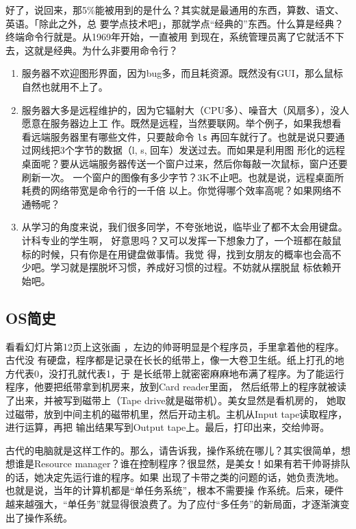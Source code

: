 \documentclass{wx672ctexart}
\newcommand\mpic[1]{%
  \marginpar{\texttt{[image: thumbnails/\#1]}}}
\begin{document}
好了，说回来，那5\%能被用到的是什么？其实就是最通用的东西，算数、语文、英语。「除此之外，总
要学点技术吧」，那就学点“经典的”东西。什么算是经典？终端命令行就是。从1969年开始，一直被用
到现在，系统管理员离了它就活不下去，这就是经典。为什么非要用命令行？
\begin{enumerate}
\item 服务器不欢迎图形界面，因为bug多，而且耗资源。既然没有GUI，那么鼠标自然也就用不上了。
\item 服务器大多是远程维护的，因为它辐射大（CPU多）、噪音大（风扇多），没人愿意在服务器边上工
作。既然是远程，当然要联网。举个例子，如果我想看看远端服务器里有哪些文件，只要敲命令 \texttt{ls}
再回车就行了。也就是说只要通过网线把3个字节的数据（l, s, 回车）发送过去。而如果是利用图
形化的远程桌面呢？要从远端服务器传送一个窗户过来，然后你每敲一次鼠标，窗户还要刷新一次。
一个窗户的图像有多少字节？3K不止吧。也就是说，远程桌面所耗费的网络带宽是命令行的一千倍
以上。你觉得哪个效率高呢？如果网络不通畅呢？
\item 从学习的角度来说，我们很多同学，不夸张地说，临毕业了都不太会用键盘。计科专业的学生啊，
好意思吗？又可以发挥一下想象力了，一个班都在敲鼠标的时候，只有你是在用键盘做事情。我觉
得，找到女朋友的概率也会高不少吧。学习就是摆脱坏习惯，养成好习惯的过程。不妨就从摆脱鼠
标依赖开始吧。
\end{enumerate}

\subsection{OS简史}
\label{sec:org0af235d}

看看幻灯片第12页上这张画\mpic{pg_0012}，左边的帅哥明显是个程序员，手里拿着他的程序。古代没
有硬盘，程序都是记录在长长的纸带上，像一大卷卫生纸。纸上打孔的地方代表0，没打孔就代表1，于
是长纸带上就密密麻麻地布满了程序。为了能运行程序，他要把纸带拿到机房来，放到Card reader里面，
然后纸带上的程序就被读了出来，并被写到磁带上（Tape drive就是磁带机）。美女显然是看机房的，
她取过磁带，放到中间主机的磁带机里，然后开动主机。主机从Input tape读取程序，进行运算，再把
输出结果写到Output tape上。最后，打印出来，交给帅哥。

古代的电脑就是这样工作的。那么，请告诉我，操作系统在哪儿？其实很简单，想想谁是Resource
manager？谁在控制程序？很显然，是美女！如果有若干帅哥排队的话，她决定先运行谁的程序。如果
出现了卡带之类的问题的话，她负责洗地。也就是说，当年的计算机都是“单任务系统”，根本不需要操
作系统。后来，硬件越来越强大，“单任务”就显得很浪费了。为了应付“多任务”的新局面，才逐渐演变
出了操作系统。
\end{document}
